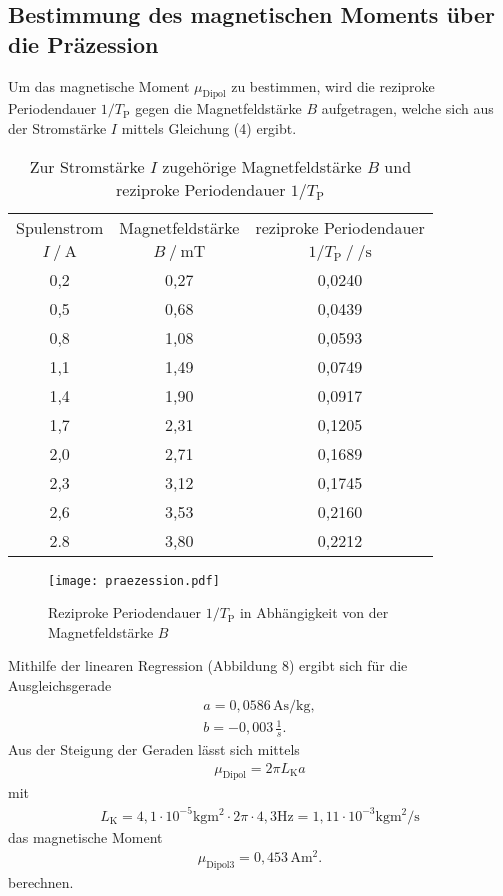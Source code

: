 \subsection{Bestimmung des magnetischen Moments über die Präzession} %
Um das magnetische Moment $\mu_\text{Dipol}$ zu bestimmen, wird die reziproke Periodendauer $1/T_\text{P}$
gegen die Magnetfeldstärke $B$ aufgetragen, welche sich aus der Stromstärke $I$ mittels Gleichung (4) ergibt.
\begin{table}
\centering
\caption{Zur Stromstärke $I$ zugehörige Magnetfeldstärke $B$ und reziproke Periodendauer $1/T_\text{P}$}
\label{tab:praezession}
\begin{tabular}{c c c}
\toprule
\multicolumn{1}{c}{Spulenstrom} & \multicolumn{1}{c}{Magnetfeldstärke} & \multicolumn{1}{c}{reziproke Periodendauer} \\
{$I\:/\:\si{\ampere}$} & {$B\:/\:\si{\milli\tesla}$} & {$1/T_\text{P}\:/\:\si{\per\second}$} \\
\midrule
0,2 & 0,27 & 0,0240 \\
0,5 & 0,68 & 0,0439 \\
0,8 & 1,08 & 0,0593 \\
1,1 & 1,49 & 0,0749 \\
1,4 & 1,90 & 0,0917 \\
1,7 & 2,31 & 0,1205 \\
2,0 & 2,71 & 0,1689 \\
2,3 & 3,12 & 0,1745 \\
2,6 & 3,53 & 0,2160 \\
2.8 & 3,80 & 0,2212 \\
\bottomrule
\end{tabular}
\end{table}
\begin{figure}
  \center
  \texttt{[image: praezession.pdf]}
  \caption{Reziproke Periodendauer $1/T_\text{P}$ in Abhängigkeit von der Magnetfeldstärke $B$}
  \label{fig:praezession}
\end{figure}
\noindent Mithilfe der linearen Regression (Abbildung 8) ergibt sich für die Ausgleichsgerade
\begin{align*}
a = 0,0586\,\si{\ampere\second\per\kilo\gram}, \\
b = -0,003\,\frac{1}{s}.
\end{align*}
Aus der Steigung der Geraden lässt sich mittels
\begin{gather}
\mu_\text{Dipol} = 2\pi L_\text{K} a
\end{gather}
mit
\begin{gather*}
L_\text{K} = 4,1 \cdot 10^{-5} \si{\kilo\gram\meter\squared} \cdot 2\pi \cdot 4,3\si{\hertz} = 1,11 \cdot 10^{-3} \si{\kilo\gram\meter\squared\per\second}
\end{gather*}
das magnetische Moment
\begin{gather*}
\mu_\text{Dipol3} = 0,453\,\si{\ampere\meter\squared}.
\end{gather*}
berechnen.